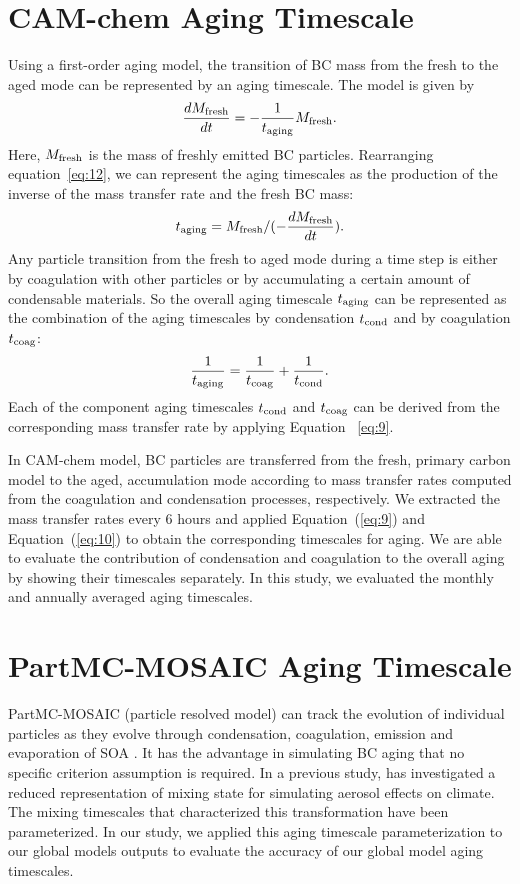 \documentclass[12pt, fullpage]{uiucthesis2009_2}
\begin{document}
	\section{CAM-chem Aging Timescale}
	Using a first-order aging model, the transition of BC mass from the fresh to the aged mode can be represented by an aging timescale. The model is given by
	\begin{align}\label{eq:12}
	\frac{dM_{\rm{fresh}}}{dt} = -\frac{1}{t_{\rm{aging}}}M_{\rm{fresh}}. 
	\end{align}
	Here, $M_{\rm{fresh}}$ is the mass of freshly emitted BC particles.
	Rearranging equation~\ref{eq:12}, we can represent the aging timescales as the production of the inverse of the mass transfer rate and the fresh BC mass: 
	\begin{align}\label{eq:9}
	t_{\rm{aging}} = M_{\rm{fresh}}/(-\frac{dM_{\rm{fresh}}}{dt}).
	\end{align}
	Any particle transition from the fresh to aged mode during a time step is either by coagulation with other particles or by accumulating a certain amount of condensable materials. So the overall aging timescale $t_{\rm{aging}}$ can be represented as the combination of the aging timescales by condensation $t_{\rm{cond}}$ and by coagulation $t_{\rm{coag}}$:
	\begin{align}\label{eq:10}
	\frac{1}{t_{\rm{aging}}} =\frac{1}{t_{\rm{coag}}} + \frac{1}{t_{\rm{cond}}}.
	\end{align}
	Each of the component aging timescales $t_{\rm{cond}}$ and $t_{\rm{coag}}$ can be derived from the corresponding mass transfer rate by applying Equation~ \ref{eq:9}. 
	
	In CAM-chem model, BC particles are transferred from the fresh, primary carbon model to the aged, accumulation mode according to mass transfer rates computed from the coagulation and condensation processes, respectively. We extracted the mass transfer rates every 6 hours and applied Equation~(\ref{eq:9}) and Equation~(\ref{eq:10}) to obtain the corresponding timescales for aging. We are able to evaluate the contribution of condensation and coagulation to the overall aging by showing their  timescales separately. In this study, we evaluated the monthly and annually averaged aging timescales. 
	
	\section{PartMC-MOSAIC Aging Timescale}\label{sec_4}
	PartMC-MOSAIC (particle resolved model) can track the evolution of individual particles as they evolve through condensation, coagulation, emission and evaporation of SOA \citep{riemer2009simulating}. It has the advantage in simulating BC aging that no specific criterion assumption is required. In a previous study, \citet{Fierce2016} has investigated a reduced representation of mixing state for simulating aerosol effects on climate. The mixing timescales that characterized this transformation have been parameterized. In our study, we applied this aging timescale parameterization to our global models outputs to evaluate the accuracy of our global model aging timescales.
	
\end{document}
